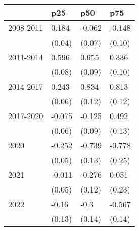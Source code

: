 \begin{tabular}{llll}
\toprule
{} &     p25 &     p50 &     p75 \\
\midrule
2008-2011 &   0.184 &  -0.062 &  -0.148 \\
          &  (0.04) &  (0.07) &  (0.10) \\
2011-2014 &   0.596 &   0.655 &   0.336 \\
          &  (0.08) &  (0.09) &  (0.10) \\
2014-2017 &   0.243 &   0.834 &   0.813 \\
          &  (0.06) &  (0.12) &  (0.12) \\
2017-2020 &  -0.075 &  -0.125 &   0.492 \\
          &  (0.06) &  (0.09) &  (0.13) \\
2020      &  -0.252 &  -0.739 &  -0.778 \\
          &  (0.05) &  (0.13) &  (0.25) \\
2021      &  -0.011 &  -0.276 &   0.051 \\
          &  (0.05) &  (0.12) &  (0.23) \\
2022      &   -0.16 &    -0.3 &  -0.567 \\
          &  (0.13) &  (0.14) &  (0.14) \\
\bottomrule
\end{tabular}
